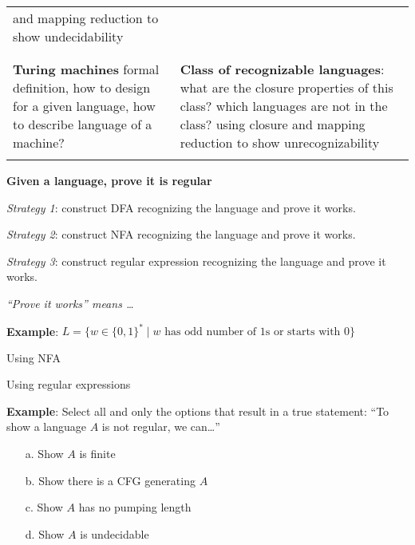 \documentclass[12pt, oneside]{article}
\begin{document}
\begin{center}
\begin{tabular}{|p{4in}|p{3.5in}|}
        and mapping reduction to show undecidability \\
        & \\
        \hline
        & \\
        {\bf Turing machines}
        formal definition, how to design for a given language, 
        how to describe language of a machine? &
        {\bf Class of recognizable languages}: what are the closure properties 
        of this class? which languages are not in the class? using closure
        and mapping reduction to show unrecognizability \\
        & \\
        \hline
    \end{tabular}
\end{center}

\newpage

{\bf Given a language, prove it is regular}

{\it Strategy 1}: construct DFA recognizing the language and prove it works.

{\it Strategy 2}: construct NFA recognizing the language and prove it works.

{\it Strategy 3}: construct regular expression recognizing the language and prove it works.

{\it ``Prove it works'' means \ldots}

\vspace{100pt}

{\bf Example}: $L  = \{ w \in \{0,1\}^* \mid \textrm{$w$ has odd number of $1$s or starts with $0$}\}$

Using NFA

\vfill

Using regular expressions

\vfill


\newpage

{\bf Example}: Select all and only the options that result in a true statement: ``To show 
a language $A$ is not regular, we can\ldots'' 

\begin{enumerate}
    \item[a.] Show $A$ is finite
    \item[b.] Show there is a CFG generating $A$
    \item[c.] Show $A$ has no pumping length
    \item[d.] Show $A$ is undecidable
\end{enumerate}

\newpage
\end{document}

